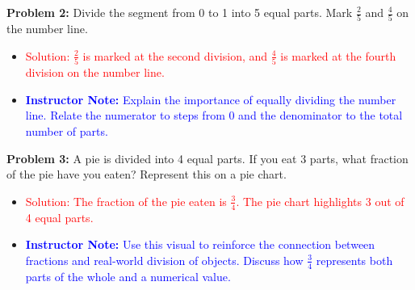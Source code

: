 \documentclass[12pt]{article}
\begin{document}
\begin{tcolorbox}[colframe=black!60, colback=white, 
coltitle=black, colbacktitle=black!15, fonttitle=\bfseries\Large, 
title=Guided Practice with Solutions (Problems 2–6), halign title=center, left=10pt, right=10pt, top=10pt, bottom=15pt]

\textbf{Problem 2:} Divide the segment from 0 to 1 into 5 equal parts. Mark \( \frac{2}{5} \) and \( \frac{4}{5} \) on the number line.
\begin{center}
\end{center}
\begin{itemize}
    \item \textcolor{red}{Solution: \( \frac{2}{5} \) is marked at the second division, and \( \frac{4}{5} \) is marked at the fourth division on the number line.}
    \item \textcolor{blue}{\textbf{Instructor Note:} Explain the importance of equally dividing the number line. Relate the numerator to steps from 0 and the denominator to the total number of parts.}
\end{itemize}

\vspace{1em}

\textbf{Problem 3:} A pie is divided into 4 equal parts. If you eat 3 parts, what fraction of the pie have you eaten? Represent this on a pie chart.
\begin{center}
\end{center}
\begin{itemize}
    \item \textcolor{red}{Solution: The fraction of the pie eaten is \( \frac{3}{4} \). The pie chart highlights 3 out of 4 equal parts.}
    \item \textcolor{blue}{\textbf{Instructor Note:} Use this visual to reinforce the connection between fractions and real-world division of objects. Discuss how \( \frac{3}{4} \) represents both parts of the whole and a numerical value.}
\end{itemize}


\end{tcolorbox}
\end{document}
